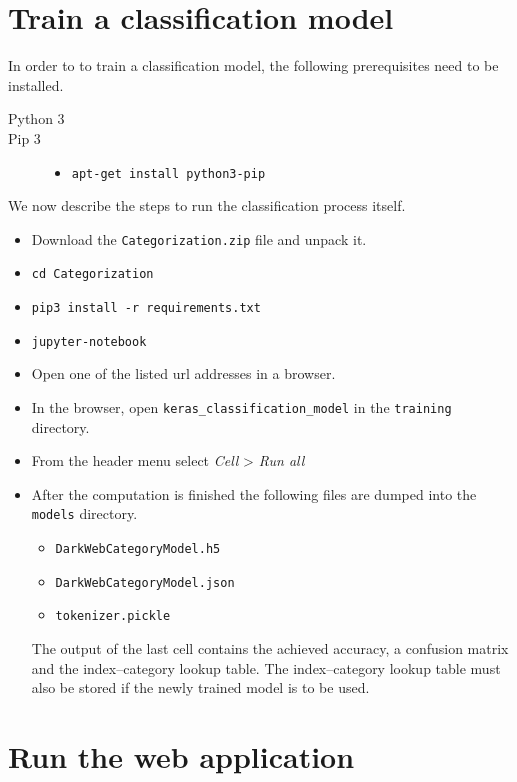 \begin{appendices}
\chapter{Train a classification model}
In order to to train a classification model, the following prerequisites need to be installed.
\begin{description}
    \item[Python 3] \hfill
    \item[Pip 3] 
        \begin{itemize}
            \item \texttt{apt-get install python3-pip}
        \end{itemize}
\end{description}
We now describe the steps to run the classification process itself.
\begin{itemize}
    \item Download the \texttt{Categorization.zip} file and unpack it.
    \item \texttt{cd Categorization}
    \item \texttt{pip3 install -r requirements.txt}
    \item \texttt{jupyter-notebook}
    \item Open one of the listed url addresses in a browser.
    \item In the browser, open \texttt{keras\_classification\_model} in the \texttt{training} directory.
    \item From the header menu select \textit{Cell} > \textit{Run all}
    \item After the computation is finished the following files are dumped into the \texttt{models} directory.
        \begin{itemize}
            \item \texttt{DarkWebCategoryModel.h5}
            \item \texttt{DarkWebCategoryModel.json}
            \item \texttt{tokenizer.pickle}
        \end{itemize}
The output of the last cell contains the achieved accuracy,  a confusion matrix and the index--category lookup table. The index--category lookup table must also be stored if the newly trained model is to be used.
\end{itemize}



\chapter{Run the web application}

\end{appendices}
